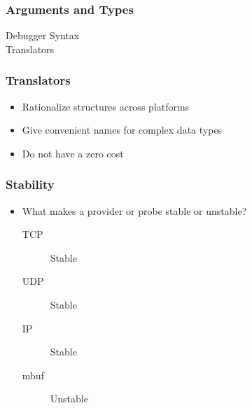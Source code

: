 \documentclass[pdftex]{beamer}
\begin{document}
\begin{frame}
  \frametitle{Arguments and Types}
  \begin{description}
  \item[Debugger Syntax] 
  \item[Translators] 
  \end{description}
\end{frame}

\begin{frame}
  \frametitle{Translators}
  \begin{itemize}
  \item Rationalize structures across platforms
  \item Give convenient names for complex data types 
  \item Do not have a zero cost
  \end{itemize}
\end{frame}

\begin{frame}
  \frametitle{Stability}
  \begin{itemize}
  \item What makes a provider or probe stable or unstable?
    \begin{description}
    \item [TCP] Stable
    \item[UDP] Stable
    \item[IP] Stable
    \item[mbuf] Unstable
    \end{description}
  \end{itemize}
\end{frame}
\end{document}
